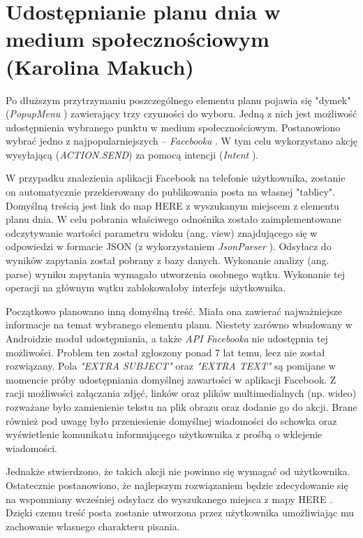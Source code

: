 \documentclass[10pt,twoside,a4paper]{report}
\begin{document}
\section{Udostępnianie planu dnia w medium społecznościowym (Karolina Makuch)}
\par  Po dłuższym przytrzymaniu poszczególnego elementu planu pojawia się "dymek"  (\textit{PopupMenu} \cite{PopupMenu}) zawierający trzy czynności do wyboru. Jedną z nich jest możliwość udostępnienia wybranego punktu w medium społecznościowym. Postanowiono wybrać jedno z najpopularniejszych – \textit{Facebooka} \cite{Facebook}. W tym celu wykorzystano akcję wysyłającą (\textit{ACTION.SEND}) za pomocą intencji (\textit{Intent} \cite{Intent}).
\par  W przypadku znalezienia aplikacji Facebook na telefonie użytkownika, zostanie on automatycznie przekierowany do publikowania posta na własnej "tablicy". Domyślną treścią jest link do map HERE \cite{mobileHere} z wyszukanym miejscem z elementu planu dnia. W celu pobrania właściwego odnośnika  zostało zaimplementowane odczytywanie wartości parametru widoku (ang. view) znajdującego się w odpowiedzi w formacie JSON (z wykorzystaniem \textit{JsonParser} \cite{JsonParser}). Odsyłacz do wyników zapytania został pobrany z bazy danych. Wykonanie analizy (ang. parse) wyniku zapytania wymagało utworzenia osobnego wątku.
Wykonanie tej operacji na głównym wątku zablokowałoby interfejs użytkownika. 
\par Początkowo planowano inną domyślną treść. Miała ona zawierać najważniejsze informacje na temat wybranego elementu planu. Niestety zarówno wbudowany w Androidzie moduł  udostępniania, a także \textit{API Facebooka} nie udostępnia tej możliwości.  Problem ten został zgłoszony ponad 7 lat temu, lecz nie został rozwiązany\cite{FacebookBug}. Pola \textit{"EXTRA SUBJECT"} oraz \textit{"EXTRA TEXT"} są pomijane w momencie próby udostępniania domyślnej zawartości w aplikacji Facebook. Z racji możliwości załączania zdjęć, linków oraz plików multimedialnych (np. wideo) rozważane było zamienienie tekstu na plik obrazu oraz dodanie go do akcji. Brane również pod uwagę było przeniesienie domyślnej wiadomości do schowka oraz wyświetlenie komunikatu informującego użytkownika z prośbą o wklejenie wiadomości.
\par Jednakże stwierdzono, że takich akcji nie powinno się wymagać od użytkownika. Ostatecznie postanowiono, że najlepszym rozwiązaniem będzie zdecydowanie się na wspomniany wcześniej odsyłacz do wyszukanego miejsca z mapy HERE \cite{mobileHere}. Dzięki czemu treść posta zostanie utworzona przez użytkownika umożliwiając mu zachowanie własnego charakteru pisania.
\end{document}
